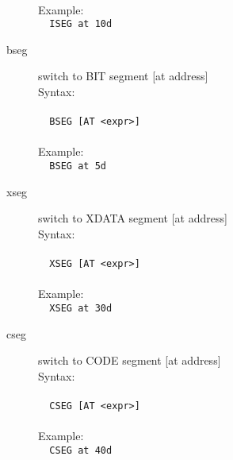 \documentclass[a4paper,twoside,12pt]{book}
\begin{document}
\begin{description}
				\verb''\\
				Example:\\
				\verb'  '{\color{highlight_directive}\verb'ISEG'}\verb' '{\color{highlight_constant}\verb'at'}\verb' '{\color{highlight_dec}\verb'10d'}\\
			\item[bseg] switch to BIT segment [at address]\\
				Syntax:\\\\
				\verb'  '{\color{highlight_directive}\verb'BSEG'}\verb' '{\color{highlight_constant}\verb'[AT'}\verb' '{\color{highlight_symbol}\verb'<'}{\color{highlight_constant}\verb'expr'}{\color{highlight_symbol}\verb'>'}{\color{highlight_constant}\verb']'}\\
				\verb''\\
				Example:\\
				\verb'  '{\color{highlight_directive}\verb'BSEG'}\verb' '{\color{highlight_constant}\verb'at'}\verb' '{\color{highlight_dec}\verb'5d'}\\
			\item[xseg] switch to XDATA segment [at address]\\
				Syntax:\\\\
				\verb'  '{\color{highlight_directive}\verb'XSEG'}\verb' '{\color{highlight_constant}\verb'[AT'}\verb' '{\color{highlight_symbol}\verb'<'}{\color{highlight_constant}\verb'expr'}{\color{highlight_symbol}\verb'>'}{\color{highlight_constant}\verb']'}\\
				\verb''\\
				Example:\\
				\verb'  '{\color{highlight_directive}\verb'XSEG'}\verb' '{\color{highlight_constant}\verb'at'}\verb' '{\color{highlight_dec}\verb'30d'}\\
			\item[cseg] switch to CODE segment [at address]\\
				Syntax:\\\\
				\verb'  '{\color{highlight_directive}\verb'CSEG'}\verb' '{\color{highlight_constant}\verb'[AT'}\verb' '{\color{highlight_symbol}\verb'<'}{\color{highlight_constant}\verb'expr'}{\color{highlight_symbol}\verb'>'}{\color{highlight_constant}\verb']'}\\
				\verb''\\
				Example:\\
				\verb'  '{\color{highlight_directive}\verb'CSEG'}\verb' '{\color{highlight_constant}\verb'at'}\verb' '{\color{highlight_dec}\verb'40d'}\\

\end{description}
\end{document}
